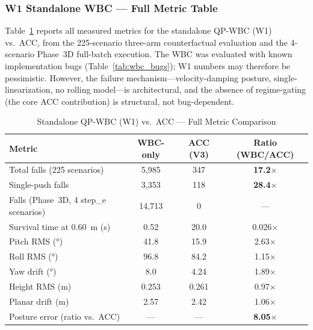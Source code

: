 \subsubsection{W1 Standalone WBC — Full Metric Table}
\label{sec:wbc_supp_w1}

Table~\ref{tab:wbc_w1_full} reports all measured metrics for the standalone QP-WBC (W1) vs.\ ACC, from the 225-scenario three-arm counterfactual evaluation and the 4-scenario Phase~3D full-batch execution.
The WBC was evaluated with known implementation bugs (Table~\ref{tab:wbc_bugs}); W1 numbers may therefore be pessimistic.
However, the failure mechanism---velocity-damping posture, single-linearization, no rolling model---is architectural, and the absence of regime-gating (the core ACC contribution) is structural, not bug-dependent.

\begin{table}[h]
\centering
\caption{Standalone QP-WBC (W1) vs.\ ACC — Full Metric Comparison}
\label{tab:wbc_w1_full}
\footnotesize
\begin{tabular}{@{}lccc@{}}
\toprule
Metric & WBC-only & ACC (V3) & Ratio (WBC/ACC) \\
\midrule
Total falls (225 scenarios)                                  & 5{,}985   & 347   & \textbf{17.2}$\times$ \\
Single-push falls                                            & 3{,}353   & 118   & \textbf{28.4}$\times$ \\
Falls (Phase~3D, 4 step\_e scenarios)                        & 14{,}713  & 0     & --- \\
Survival time at \SI{0.60}{m} (s)                            & 0.52      & 20.0  & 0.026$\times$ \\
Pitch RMS (\si{\degree})                                     & 41.8      & 15.9  & 2.63$\times$ \\
Roll RMS (\si{\degree})                                      & 96.8      & 84.2  & 1.15$\times$ \\
Yaw drift (\si{\degree})                                     & 8.0       & 4.24  & 1.89$\times$ \\
Height RMS (m)                                               & 0.253     & 0.261 & 0.97$\times$ \\
Planar drift (m)                                             & 2.57      & 2.42  & 1.06$\times$ \\
Posture error (ratio vs.\ ACC)                               & ---       & ---   & \textbf{8.05}$\times$ \\

\end{tabular}
\end{table}
